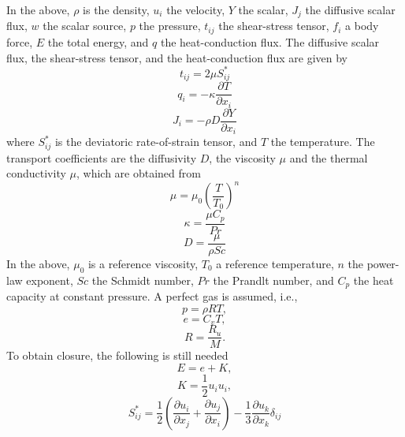 \documentclass[oneside,a4paper,11pt]{report}
\begin{document}
In the above, $\rho$ is the density, $u_i$ the velocity, $Y$ the scalar, $J_j$ the diffusive scalar flux, $w$ the scalar source, $p$ the pressure, $t_{ij}$ the shear-stress tensor, $f_i$ a body force, $E$ the total energy, and $q$ the heat-conduction flux. The diffusive scalar flux, the shear-stress tensor, and the heat-conduction flux are given by
\begin{equation}
\label{eq:shear_stress}
    t_{ij} = 2\mu S_{ij}^*
\end{equation}
\begin{equation}
    q_i = -\kappa \frac{\partial T}{\partial x_i}
\end{equation}
\begin{equation}
    \label{eq:diffusive_scalar_flux}
    J_i = -\rho D \frac{\partial Y}{\partial x_i} 
\end{equation}
where $S_{ij}^*$ is the deviatoric rate-of-strain tensor, and $T$ the temperature. The transport coefficients are the diffusivity $D$, the viscosity $\mu$ and the thermal conductivity $\mu$, which are obtained from
\begin{equation}
    \mu = \mu_0 \left ( \frac{T}{T_0} \right )^n
\end{equation}
\begin{equation}
    \kappa = \frac{\mu C_p}{Pr}
\end{equation}
\begin{equation}
    D = \frac{\mu}{\rho Sc}
\end{equation}
In the above, $\mu_0$ is a reference viscosity, $T_0$ a reference temperature, $n$ the power-law exponent, $Sc$ the Schmidt number, $Pr$ the Prandlt number, and $C_p$ the heat capacity at constant pressure. A perfect gas is assumed, i.e.,
\begin{equation}
    p = \rho R T,
\end{equation}
\begin{equation} 
    e = C_v T ,
\end{equation}
\begin{equation}
    R = \frac{R_u}{M}.
\end{equation}
To obtain closure, the following is still needed
\begin{equation}
     E = e + K ,
\end{equation}
\begin{equation}
    K = \frac{1}{2} u_i u_i ,
\end{equation}
\begin{equation}
    S^*_{ij} = \frac{1}{2} \left ( \frac{\partial u_i}{\partial x_j} + \frac{\partial u_j}{\partial x_i} \right ) - \frac{1}{3} \frac{\partial u_k}{\partial x_k} \delta_{ij} 
\end{equation}
\end{document}
